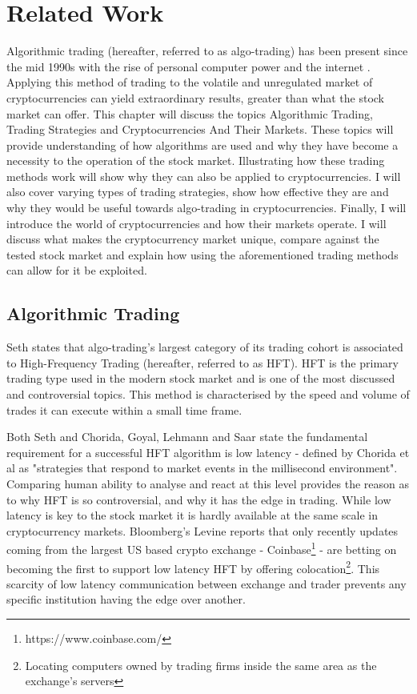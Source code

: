 %
\chapter{Related Work}
\label{sec:related}
Algorithmic trading (hereafter, referred to as algo-trading) has been present since the mid 1990s with the rise of personal computer power and the internet \cite{WEB:PISANI:2010}. Applying this method of trading to the volatile and unregulated market of cryptocurrencies can yield extraordinary results, greater than what the stock market can offer. This chapter will discuss the topics Algorithmic Trading, Trading Strategies and Cryptocurrencies And Their Markets. These topics will provide understanding of how algorithms are used and why they have become a necessity to the operation of the stock market. Illustrating how these trading methods work will show why they can also be applied to cryptocurrencies. I will also cover varying types of trading strategies, show how effective they are and why they would be useful towards algo-trading in cryptocurrencies. Finally, I will introduce the world of cryptocurrencies and how their markets operate. I will discuss what makes the cryptocurrency market unique, compare against the tested stock market and explain how using the aforementioned trading methods can allow for it be exploited. 


\section{Algorithmic Trading}
\label{sec:related:algoTrading}
\noindent Seth \cite{WEB:SETH:0001} states that algo-trading's largest category of its trading cohort is associated to High-Frequency Trading (hereafter, referred to as HFT). HFT is the primary trading type used in the modern stock market and is one of the most discussed and controversial topics. This method is characterised by the speed and volume of trades it can execute within a small time frame.

Both Seth \cite{WEB:SETH:0001} and Chorida, Goyal, Lehmann and Saar \cite{REPORT:ChordiaEtAl:2013} state the fundamental requirement for a successful HFT algorithm is low latency - defined by Chorida et al as "strategies that respond to market events in the millisecond environment". Comparing human ability to analyse and react at this level provides the reason as to why HFT is so controversial, and why it has the edge in trading. While low latency is key to the stock market it is hardly available at the same scale in cryptocurrency markets. Bloomberg's Levine reports \cite{WEB:Levine:2018} that only recently updates coming from the largest US based crypto exchange - Coinbase\footnote{https://www.coinbase.com/} - are betting on becoming the first to support low latency HFT by offering colocation\footnote{Locating computers owned by trading firms inside the same area as the exchange's servers}. This scarcity of low latency communication between exchange and trader prevents any specific institution having the edge over another.

